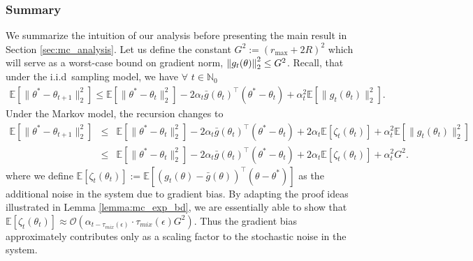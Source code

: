 \documentclass{colt2018} %
\begin{document}
\subsubsection{Summary}
We summarize the intuition of our analysis before presenting the main result in Section \ref{sec:mc_analysis}. Let us define the constant $G^2 := (r_{\max} + 2R)^2$ which will serve as a worst-case bound on gradient norm, $\norm{g_t(\theta)}^2_2 \leq G^2$.  Recall, that under the i.i.d\, sampling model, we have $\forall \,\, t\in \mathbb{N}_0$
\begin{eqnarray*}
\mathbb{E} \left[ \|\theta^*-\theta_{t+1} \|_2^2 \right] \leq \mathbb{E} \left[ \| \theta^* -\theta_t \|_2^2 \right] - 2\alpha_t \bar{g}(\theta_t)^\top \left(\theta^* - \theta_t\right) + \alpha_t^2 \mathbb{E} \left[ \| g_{t}(\theta_t) \|_2^2 \right].
\end{eqnarray*}
Under the Markov model, the recursion changes to
\begin{eqnarray*}
\mathbb{E} \left[ \|\theta^*-\theta_{t+1} \|_2^2 \right] &\leq& \mathbb{E} \left[ \| \theta^* -\theta_t \|_2^2 \right] - 2\alpha_t \bar{g}(\theta_t)^\top \left(\theta^* - \theta_t\right) + 2\alpha_t \mathbb{E}\left[ \zeta_t(\theta_t) \right] + \alpha_t^2 \mathbb{E} \left[ \| g_{t}(\theta_t) \|_2^2 \right] \\
&\leq& \mathbb{E} \left[ \| \theta^* -\theta_t \|_2^2 \right] - 2\alpha_t \bar{g}(\theta_t)^\top \left(\theta^* - \theta_t\right) + 2\alpha_t \mathbb{E}\left[ \zeta_t(\theta_t) \right] + \alpha_t^2 G^2.
\end{eqnarray*}
where we define $\mathbb{E}\left[ \zeta_t(\theta_t) \right] := \mathbb{E} \left[ \left(g_t(\theta) - \bar{g}(\theta)\right)^\top(\theta - \theta^*) \right]$ as the additional noise in the system due to gradient bias. By adapting the proof ideas illustrated in Lemma \ref{lemma:mc_exp_bd}, we are essentially able to show that $\mathbb{E}\left[ \zeta_t(\theta_t) \right] \approx \mathcal{O}(\alpha_{t-\tau_{mix}(\epsilon)} \cdot \tau_{mix}(\epsilon) G^2)$. Thus the gradient bias approximately contributes only as a scaling factor to the stochastic noise in the system.
\end{document}
